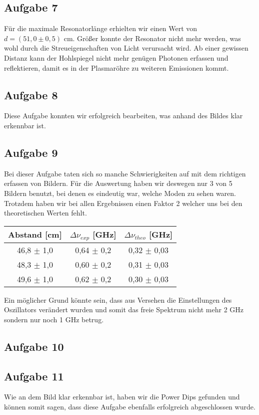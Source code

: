 \subsection{Aufgabe 7}
Für die maximale Resonatorlänge erhielten wir einen Wert von $d = (51,0\pm 0,5)$ cm. Größer konnte der Resonator nicht mehr werden, was wohl durch die Streueigenschaften von Licht verursacht wird. Ab einer gewissen Distanz kann der Hohlspiegel nicht mehr genügen Photonen erfassen und reflektieren, damit es in der Plasmaröhre zu weiteren Emissionen kommt.

\subsection{Aufgabe 8}
Diese Aufgabe konnten wir erfolgreich bearbeiten, was anhand des Bildes klar erkennbar ist.

\subsection{Aufgabe 9}
Bei dieser Aufgabe taten sich so manche Schwierigkeiten auf mit dem richtigen erfassen von Bildern. Für die Auswertung haben wir deswegen nur 3 von 5 Bildern benutzt, bei denen es eindeutig war, welche Moden zu sehen waren. Trotzdem haben wir bei allen Ergebnissen einen Faktor 2 welcher uns bei den theoretischen Werten fehlt.

\begin{center}
\begin{tabular}{c | c | c}
Abstand [cm] & $\Delta \nu_{exp}$ [GHz] & $\Delta \nu_{theo}$ [GHz]\\ \hline
46,8 $\pm$ 1,0 & 0,64 $\pm$ 0,2 & 0,32 $\pm$ 0,03\\ 
48,3 $\pm$ 1,0 & 0,60 $\pm$ 0,2 & 0,31 $\pm$ 0,03\\
49,6 $\pm$ 1,0 & 0,62 $\pm$ 0,2 & 0,30 $\pm$ 0,03\\
\end{tabular}
\end{center}

Ein möglicher Grund könnte sein, dass aus Versehen die Einstellungen des Oszillators verändert wurden und somit das freie Spektrum nicht mehr 2 GHz sondern nur noch 1 GHz betrug. 

\subsection{Aufgabe 10}

\subsection{Aufgabe 11}
Wie an dem Bild klar erkennbar ist, haben wir die Power Dips gefunden und können somit sagen, dass diese Aufgabe ebenfalls erfolgreich abgeschlossen wurde.
